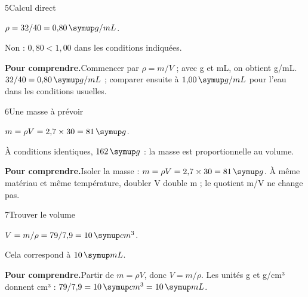 \par\noindent\begin{minipage}{\linewidth}
\begin{corrige}{5}{Calcul direct}
\begin{questions}
\item $\rho=32/40=0{,}80\unite{g/mL}$.
\item Non : $0{,}80<1{,}00$ dans les conditions indiquées.
\end{questions}
\par\smallskip\noindent\textbf{Pour comprendre.}\enspace Commencer par $\rho=m/V$ ; avec g et mL, on obtient g/mL. $32/40=0{,}80\unite{g/mL}$ ; comparer ensuite à $1{,}00\unite{g/mL}$ pour l’eau dans les conditions usuelles.\par
\end{corrige}
\end{minipage}
\par\noindent\begin{minipage}{\linewidth}
\begin{corrige}{6}{Une masse à prévoir}
\begin{questions}
\item $m=\rho V=2{,}7\times30=81\unite g$.
\item À conditions identiques, $162\unite g$ : la masse est proportionnelle au volume.
\end{questions}
\par\smallskip\noindent\textbf{Pour comprendre.}\enspace Isoler la masse : $m=\rho V=2{,}7\times30=81\unite g$. À même matériau et même température, doubler V double m ; le quotient m/V ne change pas.\par
\end{corrige}
\end{minipage}
\par\noindent\begin{minipage}{\linewidth}
\begin{corrige}{7}{Trouver le volume}
\begin{questions}
\item $V=m/\rho=79/7{,}9=10\unite{cm^3}$.
\item Cela correspond à $10\unite{mL}$.
\end{questions}
\par\smallskip\noindent\textbf{Pour comprendre.}\enspace Partir de $m=\rho V$, donc $V=m/\rho$. Les unités g et g/cm³ donnent cm³ : $79/7{,}9=10\unite{cm^3}=10\unite{mL}$.\par
\end{corrige}
\end{minipage}
